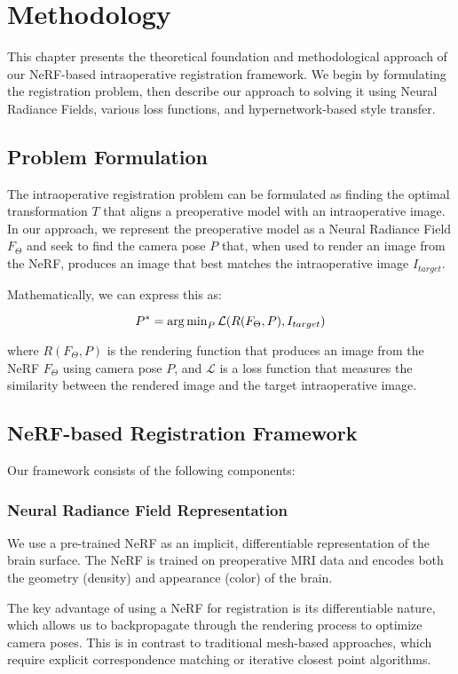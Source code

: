 \chapter{Methodology}

This chapter presents the theoretical foundation and methodological approach of our NeRF-based intraoperative registration framework. We begin by formulating the registration problem, then describe our approach to solving it using Neural Radiance Fields, various loss functions, and hypernetwork-based style transfer.

\section{Problem Formulation}
The intraoperative registration problem can be formulated as finding the optimal transformation $T$ that aligns a preoperative model with an intraoperative image. In our approach, we represent the preoperative model as a Neural Radiance Field $F_\Theta$ and seek to find the camera pose $P$ that, when used to render an image from the NeRF, produces an image that best matches the intraoperative image $I_{target}$.

Mathematically, we can express this as:

\begin{equation}
P^* = \operatorname{arg\,min}_P \mathcal{L}(R(F_\Theta, P), I_{target})
\end{equation}

where $R(F_\Theta, P)$ is the rendering function that produces an image from the NeRF $F_\Theta$ using camera pose $P$, and $\mathcal{L}$ is a loss function that measures the similarity between the rendered image and the target intraoperative image.

\section{NeRF-based Registration Framework}
Our framework consists of the following components:

\subsection{Neural Radiance Field Representation}
We use a pre-trained NeRF as an implicit, differentiable representation of the brain surface. The NeRF is trained on preoperative MRI data and encodes both the geometry (density) and appearance (color) of the brain.

The key advantage of using a NeRF for registration is its differentiable nature, which allows us to backpropagate through the rendering process to optimize camera poses. This is in contrast to traditional mesh-based approaches, which require explicit correspondence matching or iterative closest point algorithms.

